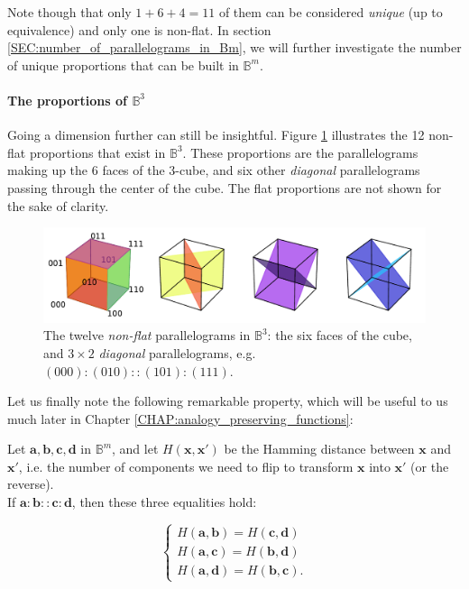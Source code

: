 Note though that only $1 + 6 + 4 = 11$ of them can be considered
\textit{unique} (up to equivalence) and only one is non-flat. In section
\ref{SEC:number_of_parallelograms_in_Bm}, we will further investigate the
number of unique proportions that can be built in $\mathbb{B}^m$.

\paragraph{The proportions of $\mathbb{B}^3$\\}

Going a dimension further can still be insightful. Figure \ref{FIG:cubes_in_B3}
illustrates the 12 non-flat proportions that exist in $\mathbb{B}^3$. These
proportions are the parallelograms making up the 6 faces of the $3$-cube, and
six other \textit{diagonal} parallelograms passing through the center of the
cube.  The flat proportions are not shown for the sake of clarity.

\begin{figure}[!h]
\centering
\includegraphics[width=\linewidth]{figures/cubes_in_B3.pdf}
  \caption{The twelve \textit{non-flat} parallelograms in $\mathbb{B}^3$: the
  six faces of the cube, and $3 \times 2$ \textit{diagonal} parallelograms,
  e.g. $(000) : (010) :: (101) : (111)$.}
\label{FIG:cubes_in_B3}
\end{figure}

Let us finally note the following remarkable property, which will be useful to
us much later in Chapter \ref{CHAP:analogy_preserving_functions}:

\begin{property}
  \label{PROPER:hamming_distance_boolean_proportion}
  Let $\mathbf{a}, \mathbf{b},\mathbf{c}, \mathbf{d}$ in $\mathbb{B}^m$, and
  let $H(\mathbf{x}, \mathbf{x'})$ be the Hamming distance between $\mathbf{x}$
  and $\mathbf{x'}$, i.e. the number of components we need to flip to transform
  $\mathbf{x}$ into $\mathbf{x'}$ (or the reverse).\\
  If $\mathbf{a} : \mathbf{b}
  :: \mathbf{c} : \mathbf{d}$, then these three equalities hold:

  $$
  \begin{cases}
    H(\mathbf{a}, \mathbf{b}) = H(\mathbf{c}, \mathbf{d})\\
    H(\mathbf{a}, \mathbf{c}) = H(\mathbf{b}, \mathbf{d})\\
    H(\mathbf{a}, \mathbf{d}) = H(\mathbf{b}, \mathbf{c}).
  \end{cases}
  $$
\end{property}

